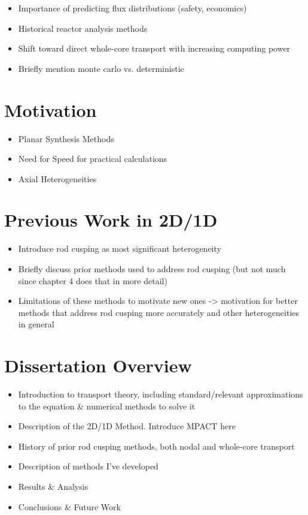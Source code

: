 \begin{itemize}
    \item Importance of predicting flux distributions (safety, economics)
    \item Historical reactor analysis methods
    \item Shift toward direct whole-core transport with increasing computing power
    \item Briefly mention monte carlo vs. deterministic
\end{itemize}

\section{Motivation}

\begin{itemize}
    \item Planar Synthesis Methods
    \item Need for Speed for practical calculations
    \item Axial Heterogeneities
\end{itemize}

\section{Previous Work in 2D/1D}

\begin{itemize}
    \item Introduce rod cusping as most significant heterogeneity
    \item Briefly discuss prior methods used to address rod cusping (but not much since chapter 4 does that in more detail)
    \item Limitations of these methods to motivate new ones -> motivation for better methods that address rod cusping more accurately and other heterogeneities in general
\end{itemize}

\section{Dissertation Overview}

\begin{itemize}
    \item Introduction to transport theory, including standard/relevant approximations to the equation \& numerical methods to solve it
    \item Description of the 2D/1D Method.  Introduce MPACT here
    \item History of prior rod cusping methods, both nodal and whole-core transport
    \item Description of methods I've developed
    \item Results \& Analysis
    \item Conclusions \& Future Work
\end{itemize}